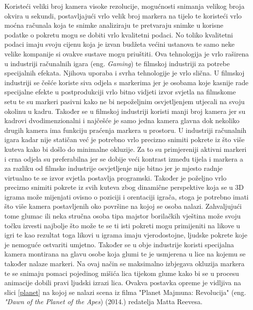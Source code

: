 \documentclass[times, utf8, diplomski]{fer}
\begin{document}
Koristeći veliki broj kamera visoke rezolucije, mogućnosti snimanja velikog broja okvira u sekundi, postavljajući vrlo velik broj 
markera na tijelo te koristeći vrlo moćna računala koja te snimke analiziraju te pretvaraju snimke u korisne podatke o pokretu
mogu se dobiti vrlo kvalitetni podaci. No toliko kvalitetni podaci imaju svoju cijenu koja je izvan budžeta većini ustanova te samo 
neke velike kompanije si ovakve sustave mogu priuštiti. Ova tehnologija je vrlo raširena u industriji računalnih igara
(eng. \textit{Gaming}) te filmskoj industriji za potrebe specijalnih efekata. Njihova uporaba i svrha tehnologije je vrlo slična.
U filmskoj industriji se češće koriste siva odjela s markerima jer je osobama koje kasnije rade specijalne efekte u postprodukciji
vrlo bitno vidjeti izvor svjetla na filmskome setu te su markeri pasivni kako ne bi nepoželjnim osvjetljenjem utjecali na svoju
okolinu u kadru. Također se u filmskoj industriji koristi manji broj kamera jer su kadrovi dvodimenzionalni i najčešće je samo
jedna kamera glavna dok nekoliko drugih kamera ima funkciju praćenja markera u prostoru. U industriji računalnih igara kadar nije
statičan već je potrebno vrlo precizno snimiti pokrete iz što više kuteva kako bi došlo do minimalne okluzije. Za to su primjereniji
aktivni markeri i crna odjela su preferabilna jer se dobije veći kontrast između tijela i markera a za razliku od filmske industrije
osvjetljenje nije bitno jer je mjesto radnje virtualno te se izvor svjetla postavlja programski. Također je poželjno vrlo precizno
snimiti pokrete iz svih kuteva zbog dinamične perspektive koja se u 3D igrama može mijenjati ovisno o poziciji i orentaciji igrača,
stoga je potrebno imati što više kamera postavljenih oko površine na kojoj se osoba nalazi. Zahvaljujući tome glumac ili neka stručna 
osoba tipa majstor borilačkih vještina može svoju točku izvesti najbolje što može te se ti isti pokreti mogu primijeniti na likove
u igri te kao rezultat toga likovi u igrama imaju vjerodostojne, ljudske pokrete koje je nemoguće ostvariti umjetno. Također se u
obje industrije koristi specijalna kamera montirana na glavu osobe koja glumi te je usmjerena u lice na kojemu se također nalaze
markeri. Na ovaj način se maksimalno izbjegava okluzija markera te se snimaju pomaci pojedinog mišića lica tijekom glume kako 
bi se u procesu animacije dobili pravi ljudski izrazi lica. Ovakva postavka opreme je vidljiva na slici \ref{planet} na kojoj se
nalazi scena iz filma "Planet Majmuna: Revolucija" (eng. \textit{"Dawn of the Planet of the Apes}) (2014.) redatelja Matta Reevesa.
\end{document}

